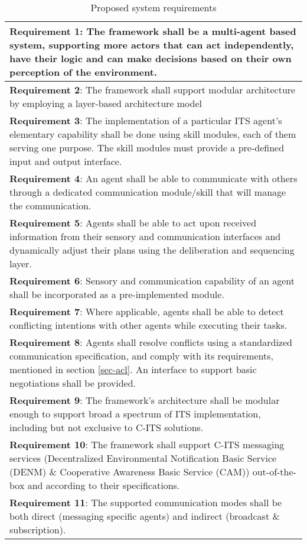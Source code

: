 \documentclass[0main.tex]{subfiles}
\begin{document}
\begin{table}[htbp]
    \small
    \caption{Proposed system requirements}
    \centering\begin{tabular}{>{\footnotesize}p{}}
        \toprule 
\textbf{Requirement 1}: The framework shall be a multi-agent based system, supporting more actors 
that can act independently, have their logic and can make decisions based on their 
own perception of the environment.
\\ \midrule
\textbf{Requirement 2}: The framework shall support modular architecture by employing a layer-based 
architecture model
\\ \midrule
\textbf{Requirement 3}: The implementation of a particular ITS agent's elementary
capability shall be done using skill modules, each of them serving one purpose. The skill modules must provide a
pre-defined input and output interface.
\\ \midrule
\textbf{Requirement 4}: An agent shall be able to communicate with others through a dedicated communication module/skill 
that will manage the communication.
\\ \midrule
\textbf{Requirement 5}: Agents shall be able to act upon received information from their sensory and communication interfaces
and dynamically adjust their plans using the deliberation and sequencing layer.
\\ \midrule
\textbf{Requirement 6}: Sensory and communication capability of an agent shall be incorporated 
as a pre-implemented module.
\\ \midrule
\textbf{Requirement 7}: Where applicable, agents shall be able to detect conflicting intentions with other agents
while executing their tasks. 
\\ \midrule
\textbf{Requirement 8}: Agents shall resolve conflicts using a standardized communication
specification, and comply with its requirements, mentioned in section \ref{sec-acl}. An
interface to support basic negotiations shall be provided.
\\ \midrule
\textbf{Requirement 9}: The framework's architecture shall be modular enough to support broad 
a spectrum of ITS implementation, including but not exclusive to C-ITS solutions.
\\ \midrule
\textbf{Requirement 10}: The framework shall support C-ITS messaging services (Decentralized
Environmental Notification Basic Service (DENM) \& Cooperative Awareness Basic Service (CAM))
out-of-the-box and according to their specifications.
\\ \midrule
\textbf{Requirement 11}: The supported communication modes shall be both direct (messaging specific agents) and indirect  
(broadcast \& subscription). 
\\ \bottomrule
    \end{tabular}
    \label{sys-requirements}
\end{table}

\clearpage
\end{document}
